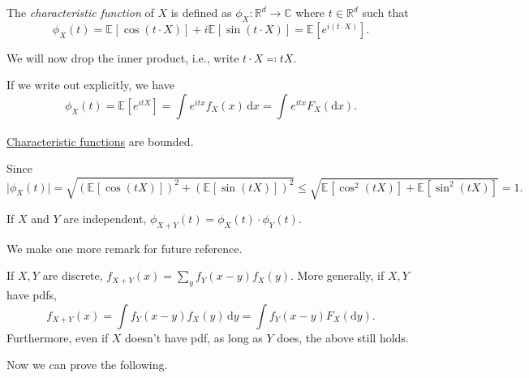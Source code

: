 \begin{definition}\label{def:characteristic-function}
	The \emph{characteristic function} of \(X\) is defined as \(\phi _X \colon \mathbb{R} ^d \to \mathbb{C} \) where \(t\in \mathbb{R} ^d\) such that
	\[
		\phi _X(t) = \mathbb{E}_{}[\cos (t \cdot X)] + i \mathbb{E}_{}[\sin (t \cdot X)] = \mathbb{E}_{}[e^{i (t \cdot X)}] .
	\]
\end{definition}

\begin{notation}
	We will now drop the inner product, i.e., write \(t\cdot X \eqqcolon t X\).
\end{notation}

If we write out explicitly, we have
\[
	\phi _X(t)
	= \mathbb{E}_{}[e^{i t X}]
	= \int_{}^{} e^{i t x} f_X(x)\,\mathrm{d}x
	= \int_{}^{} e^{i t x} F_X(\mathrm{d} x).
\]

\begin{remark}
	\hyperref[def:characteristic-function]{Characteristic functions} are bounded.
\end{remark}
\begin{explanation}
	Since
	\[
		\vert \phi _X(t) \vert
		= \sqrt{\left( \mathbb{E}_{}[\cos (t X)] \right)^2 + \left( \mathbb{E}_{}[\sin (t X)] \right)^2 }
		\leq \sqrt{\mathbb{E}_{}[\cos ^2(t X)] + \mathbb{E}_{}[\sin ^2(t X)] }
		= 1.
	\]
\end{explanation}

\begin{remark}
	If \(X\) and \(Y\) are independent, \(\phi _{X + Y}(t) = \phi _X(t) \cdot \phi _Y(t)\).
\end{remark}

We make one more remark for future reference.

\begin{remark}\label{rmk:lec8}
	If \(X, Y\) are discrete, \(f_{X + Y} (x) = \sum_{y} f_Y(x - y) f_X(y)\). More generally, if \(X, Y\) have pdfs,
	\[
		f_{X + Y}(x) = \int f_Y(x - y) f_X(y) \,\mathrm{d} y = \int f_Y(x - y) F_X(\mathrm{d} y) .
	\]
	Furthermore, even if \(X\) doesn't have pdf, as long as \(Y\) does, the above still holds.
\end{remark}

Now we can prove the following.

